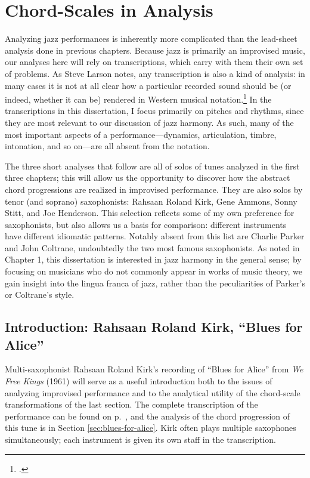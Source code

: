 \section{Chord-Scales in Analysis}
\label{sec:chord-scale-analysis}

Analyzing jazz performances is inherently more complicated than the
lead-sheet analysis done in previous chapters. Because jazz is primarily an
improvised music, our analyses here will rely on transcriptions, which carry
with them their own set of problems. As Steve Larson notes, any
transcription is also a kind of analysis: in many cases it is not at all clear
how a particular recorded sound should be (or indeed, whether it can be)
rendered in Western musical notation.\footcite[1--2]{larson:2009} In the
transcriptions in this dissertation, I focus primarily on pitches and rhythms,
since they are most relevant to our discussion of jazz harmony. As such, many
of the most important aspects of a performance---dynamics, articulation,
timbre, intonation, and so on---are all absent from the notation.

The three short analyses that follow are all of solos of tunes analyzed in the
first three chapters; this will allow us the opportunity to discover how the
abstract chord progressions are realized in improvised performance. They are
also solos by tenor (and soprano) saxophonists: Rahsaan Roland Kirk, Gene
Ammons, Sonny Stitt, and Joe Henderson. This selection reflects some of my own
preference for saxophonists, but also allows us a basis for comparison:
different instruments have different idiomatic patterns. Notably absent from
this list are Charlie Parker and John Coltrane, undoubtedly the two most
famous saxophonists. As noted in Chapter 1, this dissertation is interested in
jazz harmony in the general sense; by focusing on musicians who do not
commonly appear in works of music theory, we gain insight into the lingua
franca of jazz, rather than the peculiarities of Parker's or Coltrane's
style.

\subsection{Introduction: Rahsaan Roland Kirk, “Blues for Alice”}
\label{subsec:kirk-blues-for-alice}

Multi-saxophonist Rahsaan Roland Kirk's recording of ``Blues for Alice'' from
\emph{We Free Kings} (1961) will serve as a useful introduction both to the
issues of analyzing improvised performance and to the analytical utility of
the chord-scale transformations of the last section. The complete
transcription of the performance can be found on
p.~\pageref{transcription:blues-for-alice}, and the analysis of the chord
progression of this tune is in Section \ref{sec:blues-for-alice}. Kirk often
plays multiple saxophones simultaneously; each instrument is given its own
staff in the transcription.

